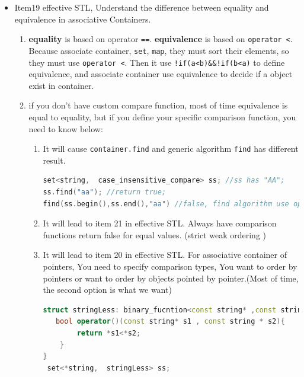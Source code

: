 \documentclass[a4paper,11pt,twoside]{book}
\begin{document}
\begin{itemize}
\item Item19 effective STL, Understand the difference between equality and equivalence in associative Containers.
  \begin{enumerate}
  \item \textbf{equality} is based on operator \texttt{==}. \textbf{equivalence} is based on \texttt{operator <}. Because associate container, \texttt{set}, \texttt{map}, they must sort their elements, so they must use \texttt{operator <}. Then it use \texttt{!if(a<b)\&\&!if(b<a)} to define equivalence, and associate container use equivalence to decide if a object exist in container.
  
  \item if you don't have custom compare function, most of time equivalence is equal to equality, but if you define your specific comparison function, you need to know below:
  
	\begin{enumerate}

  		\item It will cause \texttt{container.find} and generic algorithm \texttt{find} has different result.
\begin{lstlisting}[frame=single, language=c++]
set<string,  case_insensitive_compare> ss; //ss has "AA";
ss.find("aa"); //return true;
find(ss.begin(),ss.end(),"aa") //false, find algorithm use operator ==
\end{lstlisting}

		\item It will lead to item 21 in effective STL. Always have comparison functions return false for equal values. (strict weak ordering )
  
  		\item It will lead to item 20 in effective STL. For associative container of pointers, You need to specify comparison types, You want to order by pointers or want to order by objects pointed by pointer.(Most of time, the second option is what we want)
\begin{lstlisting}[frame=single, language=c++]
struct stringLess: binary_fucntion<const string* ,const string * , bool>{
   bool operator()(const string* s1 , const string * s2){
        return *s1<*s2;
	}
}
 set<*string,  stringLess> ss;
\end{lstlisting}

   \end{enumerate}
\end{enumerate}

\end{itemize}
\end{document}
